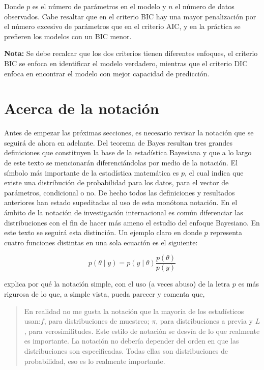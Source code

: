 \documentclass[10pt,openright]{book}\usepackage[]{graphicx}\usepackage[]{color}
\begin{document}
Donde $p$ es el número de parámetros en el modelo y $n$ el número de datos observados. Cabe resaltar que en el criterio BIC hay una mayor penalización por el número excesivo de parámetros que en el criterio AIC, y en la práctica se prefieren los modelos con un BIC menor.

\textbf{Nota:} Se debe recalcar que los dos criterios tienen diferentes enfoques, el criterio BIC se enfoca en identificar el modelo verdadero, mientras que el criterio DIC enfoca en encontrar el modelo con mejor capacidad de predicción.


\section{Acerca de la notación}

Antes de empezar las próximas secciones, es necesario revisar la notación que se seguirá de ahora en adelante. Del teorema de Bayes resultan tres grandes definiciones que constituyen la base de la estadística Bayesiana y que a lo largo de este texto se mencionarán diferenciándolas por medio de la notación. El símbolo más importante de la estadística matemática es $p$, el cual indica que existe una distribución de probabilidad para los datos, para el vector de parámetros, condicional o no. De hecho todos las definiciones y resultados anteriores han estado supeditadas al uso de esta monótona notación. En el ámbito de la notación de investigación internacional es común diferenciar las distribuciones con el fin de hacer más ameno el estudio del enfoque Bayesiano. En este texto se seguirá esta distinción. Un ejemplo claro en donde $ p$ representa cuatro funciones distintas en una sola ecuación es el siguiente:

$$ p(\theta \mid y)=p(y \mid \theta)\frac{p(\theta)}{p(y)}$$

 explica por qué la notación simple, con el uso (a veces abuso) de la letra $p$ es más rigurosa de lo que, a simple vista, pueda parecer y comenta que,

\begin{quote}
En realidad no me gusta la notación que la mayoría de los estadísticos usan:$f$, para distribuciones de muestreo; $ \pi$, para distribuciones a previa y $ L$, para verosimilitudes. Este estilo de notación se desvía de lo que realmente es importante. La notación no debería depender del orden en que las distribuciones son especificadas. Todas ellas son distribuciones de probabilidad, eso es lo realmente importante.
\end{quote}
\end{document}
